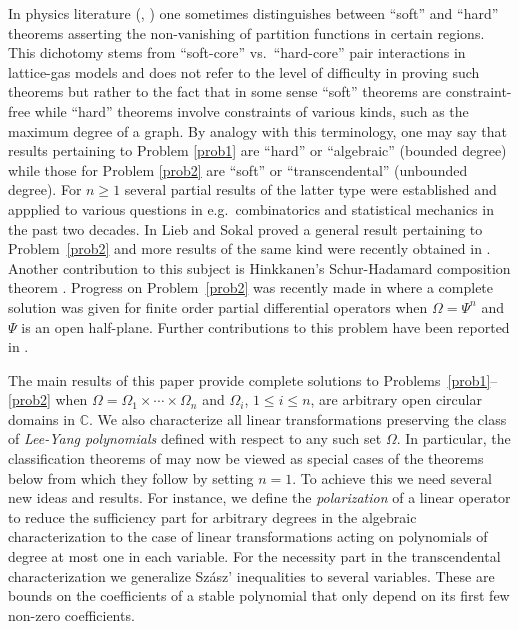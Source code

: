 \documentclass[10pt,reqno]{amsart}
\theoremstyle{plain}
\theoremstyle{definition}
\theoremstyle{remark}
\numberwithin{equation}{section}
\newcommand{\CC}{\mathbb{C}}
\begin{document}
In physics literature (\cite{sco-sok}, \cite[\S 5]{sok}) one sometimes 
distinguishes between ``soft'' and ``hard'' theorems asserting the 
non-vanishing of partition functions in certain regions. This dichotomy stems 
from ``soft-core'' vs.~``hard-core'' pair interactions in lattice-gas models 
and does not refer to the level of difficulty in proving such theorems but 
rather to the fact that in some sense ``soft'' theorems are constraint-free 
while ``hard'' theorems involve constraints of various kinds, such as the 
maximum degree of a graph. By analogy with this terminology, one may say 
that results pertaining to Problem \ref{prob1} are ``hard'' or ``algebraic'' 
(bounded degree) while those for Problem \ref{prob2} are ``soft'' or 
``transcendental'' (unbounded degree). For $n\ge 1$ several partial 
results of the latter type were established and appplied to various questions 
in e.g.~combinatorics and statistical mechanics in the past two decades. 
In \cite{LS} Lieb and Sokal proved a 
general result \cite[Proposition~2.2]{LS} pertaining to Problem~\ref{prob2} 
and more results of the same kind were recently obtained in \cite{COSW,W2}. 
Another contribution to this subject is Hinkkanen's Schur-Hadamard 
composition theorem \cite{hink}. Progress on Problem~\ref{prob2}  
was recently made in \cite{BBS3} where a complete 
solution was given for finite order partial differential operators 
when $\Omega=\Psi^n$ and $\Psi$ is an open half-plane. Further 
contributions to this problem have been reported in \cite{fisk}.

The main results of this paper provide complete solutions to 
Problems~\ref{prob1}--\ref{prob2} when 
$\Omega=\Omega_1\times\cdots\times\Omega_n$ and $\Omega_i$, $1\le i\le n$, 
are arbitrary open circular domains in $\CC$. We also characterize all 
linear transformations preserving the class of {\em Lee-Yang polynomials} 
defined with respect to any such set $\Omega$. In particular, the 
classification 
theorems of \cite{BBS1} may now be viewed as special cases of the theorems 
below from which they follow by setting $n=1$. To achieve this we need 
several new ideas and results. For instance, we define the 
{\em polarization} of a linear operator to reduce the sufficiency 
part for arbitrary degrees in the algebraic characterization to the case of 
linear transformations acting on polynomials of degree at most one in each 
variable. For the necessity part in the transcendental characterization 
we generalize Sz\'asz' inequalities \cite{szasz} to several variables. 
These are bounds on the 
coefficients of a stable polynomial that only depend on its first few 
non-zero coefficients. 
\end{document}
